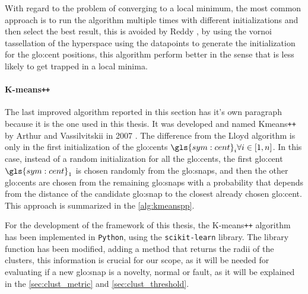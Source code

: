 With regard to the problem of converging to a local minimum, the most common approach is to run the algorithm multiple times with different initializations and then select the best result, this is avoided by Reddy \cite{Vornoi_Kmeans}, by using the vornoi tassellation of the hyperspace using the datapoints to generate the initialization for the {\gls{glo:cent}} positions, this algorithm perform better in the sense that is less likely to get trapped in a local minima.


\paragraph{K-means\texttt{++}} 
The last improved algorithm reported in this section has it's own paragraph because it is the one used in this thesis. It was developed and named Kmeans\texttt{++} by Arthur and Vassilvitskii in 2007 \cite{Kmeanspp}. The difference from the Lloyd algorithm is only in the first initialization of the {\gls{glo:cent}}s $\gls{sym:cent}_i \forall i \in [1,n]$. In this case, instead of a random initialization for all the {\gls{glo:cent}}s, the first {\gls{glo:cent}} $\gls{sym:cent}_1$ is chosen randomly from the {\gls{glo:snap}}s, and then the other {\gls{glo:cent}}s are chosen from the remaining {\gls{glo:snap}}s with a probability that depends from the distance of the candidate {\gls{glo:snap}} to the closest already chosen {\gls{glo:cent}}. This approach is summarized in the \autoref{alg:kmeanspp}.

For the development of the framework of this thesis, the K-means\texttt{++} algorithm has been implemented in \texttt{Python}, using the \texttt{scikit-learn} library. The library function has been modified, adding a method that returns the radii of the clusters, this information is crucial for our scope, as it will be needed for evaluating if a new {\gls{glo:snap}} is a novelty, normal or fault, as it will be explained in the \autoref{sec:clust_metric} and \autoref{sec:clust_threshold}.

